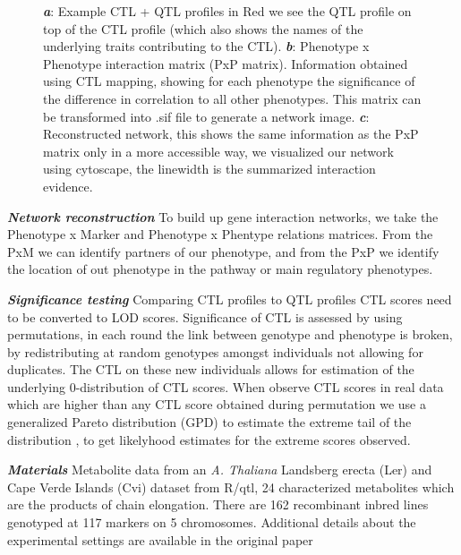 \documentclass{bioinfo}
\begin{document}
\begin{figure}[ht]
\begin{center}
{      \label{subfigc}
    }
  \end{center}
  \begin{minipage}{7in}
  \label{newplots}
  \vspace{-0.7cm}
  \caption[Plots]{
  {\emph {\bf a}}: Example CTL + QTL profiles in Red we see the QTL profile on top of the CTL profile 
  (which also shows the names of the underlying traits contributing to the CTL). {\emph {\bf b}}: 
  Phenotype x Phenotype interaction matrix (PxP matrix). Information obtained using CTL mapping, showing 
  for each phenotype the significance of the difference in correlation to all other phenotypes. 
  This matrix can be transformed into .sif file to generate a network image. {\emph {\bf c}}: Reconstructed 
  network, this shows the same information as the PxP matrix only in a more accessible way, we visualized our 
  network using cytoscape, the linewidth is the summarized interaction evidence.
 }
\end{minipage}
\vspace{-0.5cm}
\end{figure}

  
\emph{ {\bf Network reconstruction}}
  To build up gene interaction networks, we take the Phenotype x Marker and Phenotype x Phentype 
  relations matrices.  From the PxM we can identify partners of our phenotype, and from the PxP we 
  identify the location of out phenotype in the pathway or main regulatory phenotypes.

\emph{ {\bf Significance testing}}
  Comparing CTL profiles to QTL profiles CTL scores need to be converted to LOD scores. Significance 
  of CTL is assessed by using permutations, in each round the link between genotype and 
  phenotype is broken, by redistributing at random genotypes amongst individuals not 
  allowing for duplicates. The CTL on these new individuals allows for estimation of 
  the underlying 0-distribution of CTL scores. When observe CTL scores in 
  real data which are higher than any CTL score obtained during permutation we 
  use a generalized Pareto distribution (GPD) to estimate the extreme tail 
  of the distribution \cite{Knijnenburg:2009}, to get likelyhood estimates for the 
  extreme scores observed.

\emph{ {\bf Materials}}
  Metabolite data from an \emph{A. Thaliana} Landsberg erecta (Ler) and Cape Verde Islands (Cvi) 
  dataset from R/qtl, 24 characterized metabolites which are the products of chain elongation. 
  There are 162 recombinant inbred lines genotyped at 117 markers on 5 chromosomes. Additional 
  details about the experimental settings are available in the original paper \cite{Keurentjes:2006,AlonsoBlanco:1998}
\vspace{-0.6cm}
\end{document}
